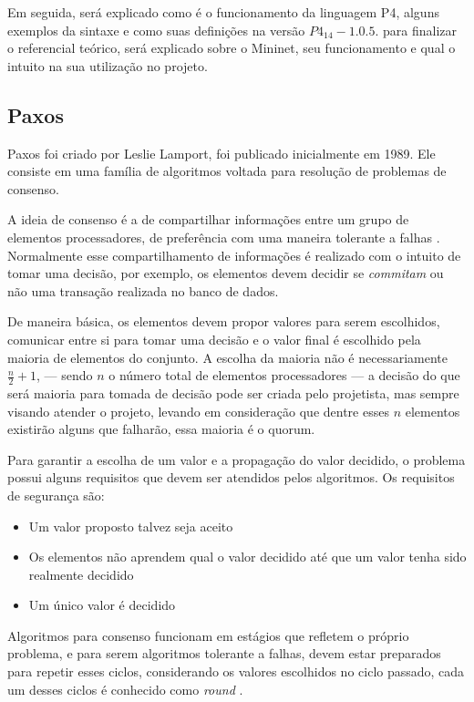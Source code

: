 \documentclass[12pt,
openright, 
oneside,
a4paper,
brazil]{facom-ufu-abntex2}
\theoremstyle{definition}
\begin{document}
Em seguida, será explicado como é o funcionamento da linguagem P4, alguns exemplos
da sintaxe e como suas definições na versão $P4_{14} - 1.0.5$. para finalizar o 
referencial teórico, será  explicado sobre o Mininet, seu funcionamento e qual o 
intuito na sua utilização no projeto.

\subsection{Paxos}
Paxos foi criado por Leslie Lamport, foi publicado inicialmente em 1989. Ele consiste em uma 
família de algoritmos voltada para resolução de problemas de consenso. 

A ideia de consenso é a de compartilhar informações entre um grupo de elementos
processadores, de preferência com uma maneira tolerante a falhas \citep{barborak1993consensus}.
Normalmente esse compartilhamento de informações é realizado com o intuito de tomar
uma decisão, por exemplo, os elementos devem decidir se \textit{commitam} ou não
uma transação realizada no banco de dados. 

De maneira básica, os elementos devem propor valores para serem escolhidos, 
comunicar entre si para tomar uma decisão e o valor final é escolhido pela maioria de 
elementos do conjunto.
A escolha da maioria não é necessariamente $\frac{n}{2}+1$, --- sendo $n$ o número
total de elementos processadores --- a decisão do que será maioria para tomada de decisão
pode ser criada pelo projetista, mas sempre visando atender o projeto, levando
em consideração que dentre esses $n$ elementos existirão alguns que falharão, essa maioria
é o quorum.

Para garantir a escolha de um valor e a propagação do valor decidido, o problema
possui alguns requisitos que devem ser atendidos pelos algoritmos. Os requisitos de
segurança são:

\begin{itemize}
    \item Um valor proposto talvez seja aceito
    \item Os elementos não aprendem qual o valor decidido até que um valor 
    tenha sido realmente decidido
    \item Um único valor é decidido
\end{itemize}

Algoritmos para consenso funcionam em estágios que refletem o próprio problema, e para
serem algoritmos tolerante a falhas, devem estar preparados para repetir esses ciclos,
considerando os valores escolhidos no ciclo passado, cada um desses ciclos é conhecido como
\textit{round} \citep{camargos2008multicoordinated}.
\end{document}
